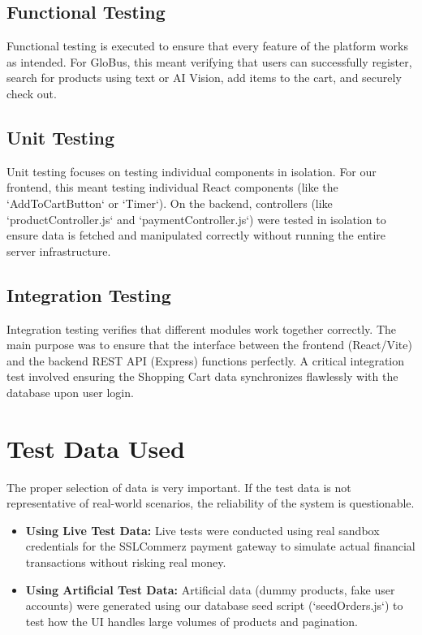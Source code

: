\subsection{Functional Testing}
Functional testing is executed to ensure that every feature of the platform works as intended. For GloBus, this meant verifying that users can successfully register, search for products using text or AI Vision, add items to the cart, and securely check out.

\subsection{Unit Testing}
Unit testing focuses on testing individual components in isolation. For our frontend, this meant testing individual React components (like the `AddToCartButton` or `Timer`). On the backend, controllers (like `productController.js` and `paymentController.js`) were tested in isolation to ensure data is fetched and manipulated correctly without running the entire server infrastructure.

\subsection{Integration Testing}
Integration testing verifies that different modules work together correctly. The main purpose was to ensure that the interface between the frontend (React/Vite) and the backend REST API (Express) functions perfectly. A critical integration test involved ensuring the Shopping Cart data synchronizes flawlessly with the database upon user login.

\section{Test Data Used}
The proper selection of data is very important. If the test data is not representative of real-world scenarios, the reliability of the system is questionable.
\begin{itemize}
    \item \textbf{Using Live Test Data:} Live tests were conducted using real sandbox credentials for the SSLCommerz payment gateway to simulate actual financial transactions without risking real money.
    \item \textbf{Using Artificial Test Data:} Artificial data (dummy products, fake user accounts) were generated using our database seed script (`seedOrders.js`) to test how the UI handles large volumes of products and pagination.
\end{itemize}

